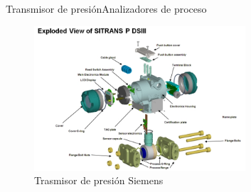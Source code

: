 \documentclass[10pt]{beamer}
\begin{document}
{%

 \begin{frame}{ Transmisor de presión}{Analizadores de proceso}

 \begin{figure}%
\includegraphics[width=0.7\textwidth]{figura_20.jpg} %
\caption{\label{fig:17} Trasmisor de presión Siemens } %
\end{figure}
\end{frame}

}
\end{document}
